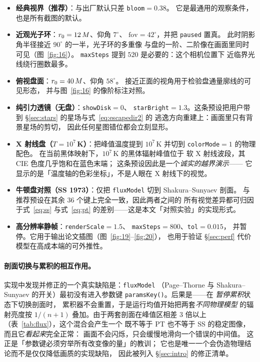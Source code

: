 \begin{itemize}[leftmargin=1.5em,itemsep=2pt,topsep=3pt]
\item \textbf{经典视界（推荐）}：与出厂默认只差 \texttt{bloom}$=0.38$。
      它是最通用的观察条件，也是所有截图的默认。
\item \textbf{近观光子环}：$r_0=12\,M$、仰角 $7^\circ$、
      $\mathrm{fov}=42^\circ$，并把 \texttt{paused} 置真。
      此时阴影角半径接近 $90^\circ$ 的一半，光子环的多重像
      与盘的一阶、二阶像在画面里同时可见（图~\ref{fig:16}）。
      \texttt{maxSteps} 提到 $520$ 是必要的：这个相机位置下
      近临界光线绕行圈数最多。
\item \textbf{俯视盘面}：$r_0=40\,M$、仰角 $58^\circ$。
      接近正面的视角用于检验盘通量廓线的可见形态，
      并与图~\ref{fig:16} 的像阶标注对照。
\item \textbf{纯引力透镜（无盘）}：\texttt{showDisk}$=0$、
      \texttt{starBright}$=1.3$。这条预设把用户带到
      §\ref{sec:stars} 的星场与式~\eqref{eq:escapedir2} 的
      逃逸方向重建上：画面里只有背景星场的剪切，
      因此任何星图错位都会立刻显形。
\item \textbf{X 射线盘（$T=10^{7}$\,K）}：把峰值温度提到
      $10^{7}$\,K 并切到 \texttt{colorMode}$=1$ 的物理配色。
      在当前黑体映射下，$10^{7}$\,K 的黑体辐射峰值位于
      软 X 射线波段，其 CIE 色度几乎饱和在蓝色末端；
      这条预设因此是一个\emph{诚实的越界演示}——
      它显示的是「温度轴的色彩坐标」，不是人眼在 X 射线下的视觉。
\item \textbf{牛顿盘对照（SS 1973）}：仅把
      \texttt{fluxModel} 切到 Shakura--Sunyaev 剖面。
      与推荐预设在其余 36 个键上完全一致，因此两者之间的
      所有视觉差异都可归因于式~\eqref{eq:ss} 与式~\eqref{eq:pt}
      的差别——这是本文「对照实验」的实现形式。
\item \textbf{高分辨率静帧}：\texttt{renderScale}$=1.5$、
      \texttt{maxSteps}$=800$、\texttt{tol}$=0.015$，
      并暂停。它用于输出论文插图（图~\ref{fig:19}--\ref{fig:20}），
      也用于验证 §\ref{sec:perf} 代价模型在高成本端的可外推性。
\end{itemize}

\paragraph{剖面切换与累积的相互作用。}
实现中发现并修正的一个真实缺陷是：\texttt{fluxModel}
（Page--Thorne 与 Shakura--Sunyaev 的开关）最初没有进入参数键
\texttt{paramsKey()}。后果是——在 \emph{暂停累积}状态下切换剖面时，
累积器不会重置，于是运行均值开始把两套\emph{不同物理模型}
的辐射亮度按 $1/(n+1)$ 叠加。由于两套剖面在峰值区相差
$3$ 倍以上（表~\ref{tab:flux}），这个混合会产生一个
既不等于 PT 也不等于 SS 的稳定图像，而且它\emph{看起来}完全正常：
画面不会闪烁，只会缓慢地滑向一个错误的中间值。
这正是「参数键必须穷举所有改变像的量」的教训；
它也是唯一一个会伪造物理结论而不是仅仅降低画质的实现缺陷，
因此被列入 §\ref{sec:intro} 的修正清单。

